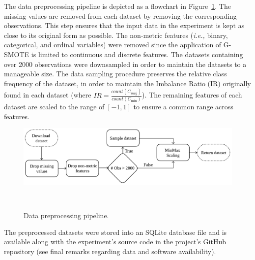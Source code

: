 \begin{table}
    \centering
    \setlength{\tabcolsep}{2pt}
    \caption[Description of the datasets collected after data preprocessing.
    ]{%
        \label{tab:datasets_description}
        Description of the datasets collected after data preprocessing. The
        sampling strategy is similar across datasets. Legend: (IR) Imbalance
        Ratio
    }
\end{table}

The data preprocessing pipeline is depicted as a flowchart in
Figure~\ref{fig:data_preprocessing}. The missing values are removed from each
dataset by removing the corresponding observations. This step ensures that the
input data in the experiment is kept as close to its original form as
possible. The non-metric features (\textit{i.e.,} binary, categorical, and
ordinal variables) were removed since the application of G-SMOTE is limited to
continuous and discrete features. The datasets containing over 2000
observations were downsampled in order to maintain the datasets to a
manageable size. The data sampling procedure preserves the relative class
frequency of the dataset, in order to maintain the Imbalance Ratio (IR)
originally found in each dataset (where $IR =
\frac{count(C_{maj})}{count(C_{\min})}$). The remaining features of each
dataset are scaled to the range of $[-1, 1]$ to ensure a common range across
features.

\begin{figure}[t]
	\centering
	\includegraphics[width=.8\linewidth]{data_preprocessing}
    \caption{%
        Data preprocessing pipeline.
    }~\label{fig:data_preprocessing}
\end{figure}

The preprocessed datasets were stored into an SQLite database file and is
available along with the experiment's source code in the project's GitHub
repository (see final remarks regarding data and software availability).
 
